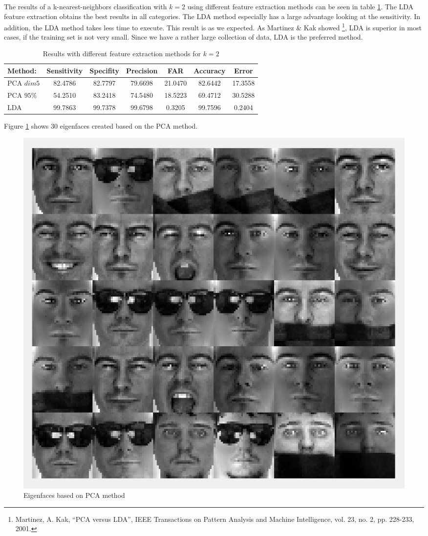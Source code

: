 The results of a k-nearest-neighbors classification with $k=2$ using different feature extraction methods can be seen in table \ref{tab:res}. The LDA feature extraction obtains the best results in all categories. The LDA method especially has a large advantage looking at the sensitivity. In addition, the LDA method takes less time to execute. This result is as we expected. As Martinez \& Kak showed \footnote{Martinez, A. Kak, ``PCA versus LDA'', IEEE Transactions on Pattern Analysis and Machine Intelligence, vol. 23, no. 2, pp. 228-233, 2001.}, LDA is superior in most cases, if the training set is not very small. Since we have a rather large collection of data, LDA is the preferred method.
\begin{table}
\centering
\begin{tabular}{l|c|c|c|c|c|c|}
\textbf{Method:} & \textbf{Sensitivity} & \textbf{Specifity} & \textbf{Precision} & \textbf{FAR} & \textbf{Accuracy} & \textbf{Error}\\
  \hline
PCA $ dim5 $ & 82.4786 & 82.7797 & 79.6698 & 21.0470 & 82.6442 & 17.3558 \\
  \hline
PCA $95\%$  & 54.2510 & 83.2418 & 74.5480 & 18.5223 & 69.4712 & 30.5288 \\
  \hline
LDA  & 99.7863 & 99.7378 & 99.6798 & 0.3205 & 99.7596 & 0.2404 \\
\hline

\end{tabular}
\caption{Results with different feature extraction methods for $k=2$}
\label{tab:res}
\end{table}

Figure \ref{fig:eigen} shows 30 eigenfaces created based on the PCA method.  

\begin{figure}[hbt]
  \includegraphics{img/eigenfaces}
  \caption{Eigenfaces based on PCA method}
  \label{fig:eigen}
\end{figure}


